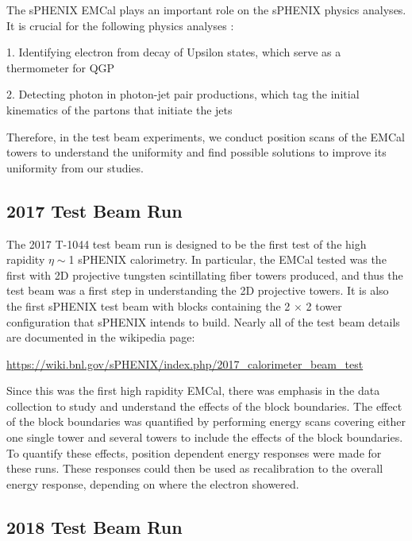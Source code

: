 \documentclass[hidelinks,11pt]{article}
\numberwithin{figure}{section}
\numberwithin{table}{section}
\begin{document}
The sPHENIX EMCal plays an important role on the sPHENIX physics analyses. It is crucial for the following physics analyses \cite{sPHENIXPaper}: 

1. Identifying electron from decay of Upsilon states, which serve as a thermometer for QGP

2. Detecting photon in photon-jet pair productions, which tag the initial kinematics of the partons that initiate the jets

Therefore, in the test beam experiments, we conduct position scans of the EMCal towers to understand the uniformity and find possible solutions to improve its uniformity from our studies. 

\subsection{2017 Test Beam Run}

The 2017 T-1044 test beam run is designed to be the first test of the high rapidity $\eta\sim$1 sPHENIX calorimetry. In particular, the EMCal tested was the first with 2D projective tungsten scintillating fiber towers produced, and thus the test beam was a first step in understanding the 2D projective towers. It is also the first sPHENIX test beam with blocks containing the 2 $\times$ 2 tower configuration that sPHENIX intends to build. Nearly all of the test beam details are documented in the wikipedia page:

\url{https://wiki.bnl.gov/sPHENIX/index.php/2017\_calorimeter\_beam\_test}

\noindent Since this was the first high rapidity EMCal, there was emphasis in the data collection to study and understand the effects of the block boundaries. The effect of the block boundaries was quantified by performing energy scans covering either one single tower and several towers to include the effects of the block boundaries. To quantify these effects, position dependent energy responses were made for these runs. These responses could then be used as recalibration to the overall energy response, depending on where the electron showered. %




\subsection{2018 Test Beam Run}
\end{document}
